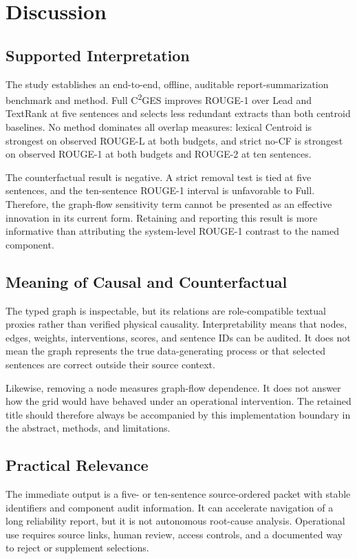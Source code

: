 \documentclass[applsci,article,submit,moreauthors]{Definitions/mdpi}
\newcommand{\cges}{C\textsuperscript{2}GES}
\begin{document}
\section{Discussion}

\subsection{Supported Interpretation}

The study establishes an end-to-end, offline, auditable report-summarization benchmark and method. Full \cges{} improves ROUGE-1 over Lead and TextRank at five sentences and selects less redundant extracts than both centroid baselines. No method dominates all overlap measures: lexical Centroid is strongest on observed ROUGE-L at both budgets, and strict no-CF is strongest on observed ROUGE-1 at both budgets and ROUGE-2 at ten sentences.

The counterfactual result is negative. A strict removal test is tied at five sentences, and the ten-sentence ROUGE-1 interval is unfavorable to Full. Therefore, the graph-flow sensitivity term cannot be presented as an effective innovation in its current form. Retaining and reporting this result is more informative than attributing the system-level ROUGE-1 contrast to the named component.

\subsection{Meaning of Causal and Counterfactual}

The typed graph is inspectable, but its relations are role-compatible textual proxies rather than verified physical causality. Interpretability means that nodes, edges, weights, interventions, scores, and sentence IDs can be audited. It does not mean the graph represents the true data-generating process or that selected sentences are correct outside their source context.

Likewise, removing a node measures graph-flow dependence. It does not answer how the grid would have behaved under an operational intervention. The retained title should therefore always be accompanied by this implementation boundary in the abstract, methods, and limitations.

\subsection{Practical Relevance}

The immediate output is a five- or ten-sentence source-ordered packet with stable identifiers and component audit information. It can accelerate navigation of a long reliability report, but it is not autonomous root-cause analysis. Operational use requires source links, human review, access controls, and a documented way to reject or supplement selections.
\end{document}
